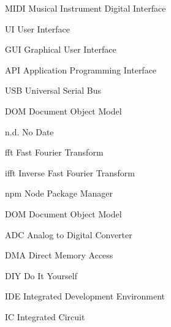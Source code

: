 \begin{acronyms}
  \item[MIDI] Musical Instrument Digital Interface
  \item[UI] User Interface
  \item[GUI] Graphical User Interface
  \item[API] Application Programming Interface
  \item[USB] Universal Serial Bus
  \item[DOM] Document Object Model
  \item[n.d.] No Date
  \item[fft] Fast Fourier Transform
  \item[ifft] Inverse Fast Fourier Transform
  \item[npm] Node Package Manager
  \item[DOM] Document Object Model
  \item[ADC] Analog to Digital Converter
  \item[DMA] Direct Memory Access
  \item[DIY] Do It Yourself
  \item[IDE] Integrated Development Environment
  \item[IC] Integrated Circuit
\end{acronyms}

